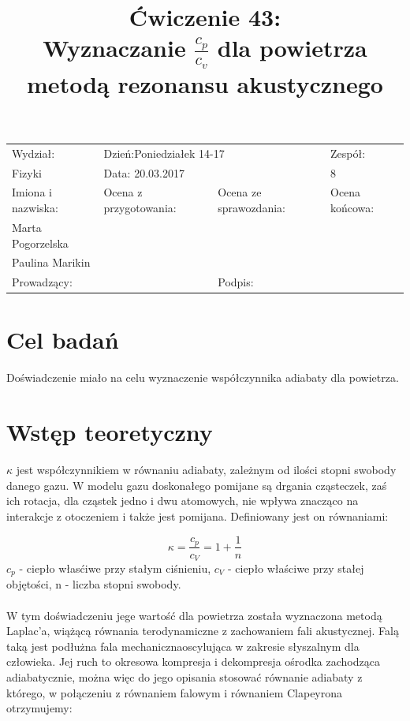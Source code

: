 \documentclass[a4paper,10pt]{article}
\def\arraystretch{1.2}
\begin{document}
\begin{table}
  \centering
  \def\arraystretch{1.5}
    \begin{tabular}{|l|l|l|l|} \hline
    Wydział:           & \multicolumn{2}{l|}{Dzień:Poniedziałek 14-17}    &Zespół:  \\
    Fizyki             &    \multicolumn{2}{l|}{Data: 20.03.2017}         &8             \\\hline
    Imiona i nazwiska: &Ocena z przygotowania:  &Ocena ze sprawozdania:   &Ocena końcowa: \\
    Marta Pogorzelska  &                        &                         &                \\
    Paulina Marikin    &                        &                         &\\\hline
    \multicolumn{2}{|l|}{Prowadzący:                 } &\multicolumn{2}{l|}{Podpis:             }  \\\hline
  \end{tabular}
\end{table}

\title{Ćwiczenie 43:\\Wyznaczanie $\frac{c_p}{c_v}$ dla powietrza metodą rezonansu akustycznego}
\date{}
\maketitle

\section{Cel badań}
Doświadczenie miało na celu wyznaczenie współczynnika adiabaty dla powietrza.

\section{Wstęp teoretyczny}
$\kappa$ jest współczynnikiem w równaniu adiabaty, zależnym od ilości stopni swobody danego gazu. W modelu gazu doskonałego pomijane są drgania cząsteczek, zaś ich rotacja,
dla cząstek jedno i dwu atomowych, nie wpływa znacząco na interakcje z otoczeniem i także jest pomijana. Definiowany jest on równaniami:

\begin{equation}
  \kappa = \frac{c_p}{c_V} = 1+\frac{1}{n}
\end{equation}
$c_p$ - ciepło własćiwe przy stałym ciśnieniu, $c_V$ - ciepło właściwe przy stałej objętości, n - liczba stopni swobody.
\\\\W tym doświadczeniu jege wartość dla powietrza została wyznaczona metodą Laplac'a, wiążącą równania terodynamiczne z zachowaniem fali akustycznej. Falą taką jest podłużna
fala mechanicznaoscylująca w zakresie słyszalnym dla człowieka. Jej ruch to okresowa kompresja i dekompresja ośrodka zachodząca adiabatycznie, można więc do jego opisania stosować
równanie adiabaty z którego, w połączeniu z równaniem falowym i równaniem Clapeyrona otrzymujemy:
\end{document}
